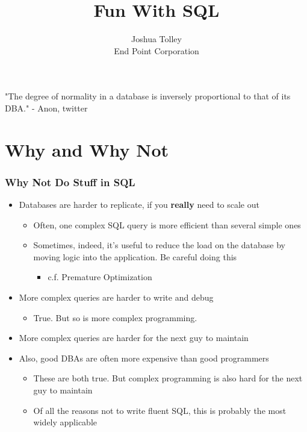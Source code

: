 \documentclass{beamer}
\begin{document}
\title{Fun With SQL}
\author{Joshua Tolley\\
    End Point Corporation
}

\frame{\titlepage}

\begin{frame}
"The degree of normality in a database is inversely proportional to that of its DBA."
- Anon, twitter
\end{frame}

\section{Why and Why Not}
\begin{frame}
    \frametitle{Why Not Do Stuff in SQL}
    \begin{itemize}
        \item Databases are harder to replicate, if you \textbf{really} need to scale out
        \pause
        \begin{itemize}
            \item Often, one complex SQL query is more efficient than several simple ones
            \pause
            \item Sometimes, indeed, it's useful to reduce the load on the database by moving logic into the application. Be careful doing this
            \pause
            \begin{itemize}
                \item c.f. Premature Optimization
                \pause
            \end{itemize}
        \end{itemize}
        \item More complex queries are harder to write and debug
        \pause
        \begin{itemize}
            \item True. But so is more complex programming.
            \pause
        \end{itemize}
        \item More complex queries are harder for the next guy to maintain
        \pause
        \item Also, good DBAs are often more expensive than good programmers
        \pause
        \begin{itemize}
            \item These are both true. But complex programming is also hard for the next guy to maintain
            \pause
            \item Of all the reasons not to write fluent SQL, this is probably the most widely applicable
        \end{itemize}
    \end{itemize}
\end{frame}
\end{document}
